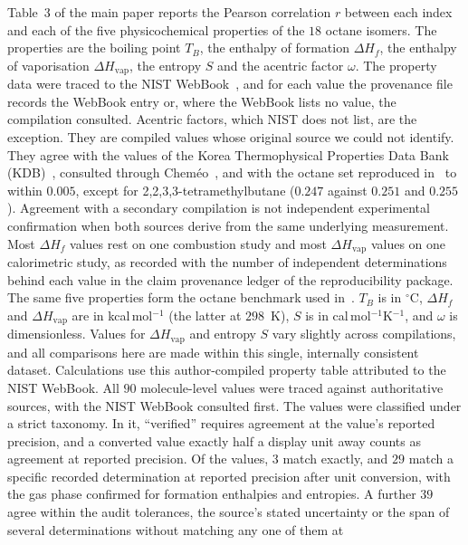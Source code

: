 \documentclass[a5paper, 10pt]{article}
\theoremstyle{plain}
\theoremstyle{remark}
\theoremstyle{definition}
\begin{document}
Table~3 of the main paper reports the Pearson correlation $r$ between
each index and each of the five physicochemical properties of the
$18$ octane isomers. The properties are the boiling point $T_B$, the
enthalpy of formation $\Delta H_f$, the enthalpy of vaporisation
$\Delta H_{\mathrm{vap}}$, the entropy $S$ and the acentric factor
$\omega$. The property data were traced to the NIST
WebBook~\cite{NISTWebBook}, and for each value the provenance file
records the WebBook entry or, where the WebBook lists no value, the
compilation consulted. Acentric factors, which NIST does not list, are the exception. They are compiled values whose original source we could not identify. They agree with the values of the Korea Thermophysical Properties Data Bank (KDB)~\cite{KDB}, consulted through Chem\'eo~\cite{Chemeo}, and with the octane set reproduced in~\cite{Ediz2017Octane} to within $0.005$, except for 2,2,3,3-tetramethylbutane ($0.247$ against $0.251$ and $0.255$). Agreement with a secondary compilation is not independent experimental confirmation when both sources derive from the same underlying measurement. Most $\Delta H_f$ values rest on one combustion study and most $\Delta H_{\mathrm{vap}}$ values on one calorimetric study, as recorded with the number of independent determinations behind each value in the claim provenance ledger of the reproducibility package.
The same five properties form the octane benchmark used
in~\cite{MovahediGutmanRedzepovicFurtula2026}. $T_B$ is in
$^{\circ}$C, $\Delta H_f$ and $\Delta H_{\mathrm{vap}}$ are in
kcal\,mol$^{-1}$ (the latter at $298$~K), $S$ is in
cal\,mol$^{-1}$K$^{-1}$, and $\omega$ is dimensionless. Values for
$\Delta H_{\mathrm{vap}}$ and entropy $S$ vary slightly across
compilations, and all comparisons here are made within this single,
internally consistent dataset. Calculations use this author-compiled
property table attributed to the NIST WebBook. All $90$
molecule-level values were traced against authoritative sources, with
the NIST WebBook consulted first. The values were
classified under a strict taxonomy. In it, ``verified'' requires
agreement at the value's reported precision, and a converted value
exactly half a display unit away counts as agreement at reported
precision. Of the values, $3$ match exactly, and $29$ match a specific
recorded determination at reported precision after unit conversion,
with the gas phase confirmed for formation enthalpies and entropies.
A further $39$ agree
within the audit tolerances, the source's stated uncertainty or the
span of several determinations without matching any one of them at
\end{document}
